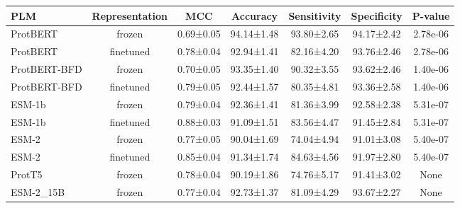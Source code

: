\begin{tabular}{lcccccc}
\toprule
         PLM & Representation &       MCC &   Accuracy & Sensitivity & Specificity &  P-value \\
\midrule
    ProtBERT &         frozen & 0.69±0.05 & 94.14±1.48 &  93.80±2.65 &  94.17±2.42 & 2.78e-06 \\
    ProtBERT &      finetuned & 0.78±0.04 & 92.94±1.41 &  82.16±4.20 &  93.76±2.46 & 2.78e-06 \\
ProtBERT-BFD &         frozen & 0.70±0.05 & 93.35±1.40 &  90.32±3.55 &  93.62±2.46 & 1.40e-06 \\
ProtBERT-BFD &      finetuned & 0.79±0.05 & 92.44±1.57 &  80.35±4.81 &  93.36±2.58 & 1.40e-06 \\
      ESM-1b &         frozen & 0.79±0.04 & 92.36±1.41 &  81.36±3.99 &  92.58±2.38 & 5.31e-07 \\
      ESM-1b &      finetuned & 0.88±0.03 & 91.09±1.51 &  83.56±4.47 &  91.45±2.84 & 5.31e-07 \\
       ESM-2 &         frozen & 0.77±0.05 & 90.04±1.69 &  74.04±4.94 &  91.01±3.08 & 5.40e-07 \\
       ESM-2 &      finetuned & 0.85±0.04 & 91.34±1.74 &  84.63±4.56 &  91.97±2.80 & 5.40e-07 \\
      ProtT5 &         frozen & 0.78±0.04 & 90.19±1.86 &  74.76±5.17 &  91.41±3.02 &      None \\
   ESM-2_15B &         frozen & 0.77±0.04 & 92.73±1.37 &  81.09±4.29 &  93.67±2.27 &      None \\
\bottomrule
\end{tabular}
